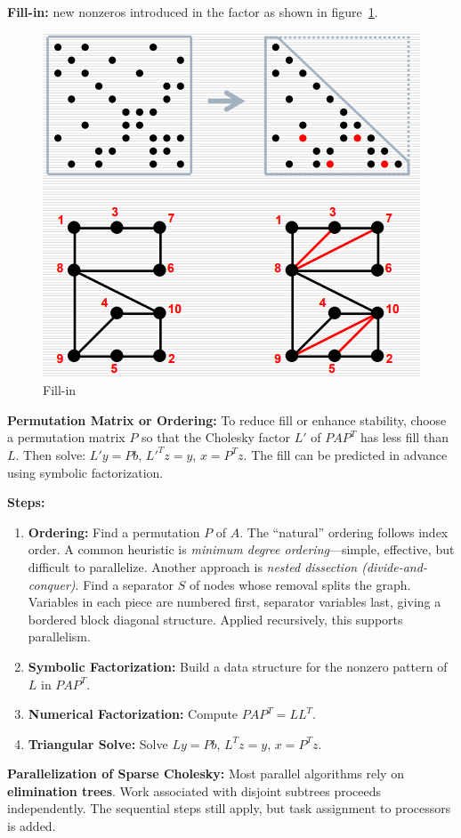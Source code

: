 \documentclass[12pt]{book}
\begin{document}
\textbf{Fill-in:} new nonzeros introduced in the factor as shown in figure~\ref{fig:fillins}.\\
\begin{figure}[ht]
    \centering
    \includegraphics[width=0.5\linewidth]{images/Fillin.png}
    \caption{Fill-in}
    \label{fig:fillins}
\end{figure}
\textbf{Permutation Matrix or Ordering:} To reduce fill or enhance stability, choose a permutation matrix $P$ so that the Cholesky factor $L'$ of $PAP^T$ has less fill than $L$.  
Then solve: $L'y = Pb$, $L'^T z = y$, $x = P^T z$.  
The fill can be predicted in advance using symbolic factorization.

\textbf{Steps:}
\begin{enumerate}
    \item \textbf{Ordering:} Find a permutation $P$ of $A$. The ``natural'' ordering follows index order.  
    A common heuristic is \emph{minimum degree ordering}—simple, effective, but difficult to parallelize.  
    Another approach is \emph{nested dissection (divide-and-conquer)}. Find a separator $S$ of nodes whose removal splits the graph. Variables in each piece are numbered first, separator variables last, giving a bordered block diagonal structure. Applied recursively, this supports parallelism.
    \item \textbf{Symbolic Factorization:} Build a data structure for the nonzero pattern of $L$ in $PAP^T$.
    \item \textbf{Numerical Factorization:} Compute $PAP^T = LL^T$.
    \item \textbf{Triangular Solve:} Solve $Ly = Pb$, $L^T z = y$, $x = P^T z$.
\end{enumerate}

\textbf{Parallelization of Sparse Cholesky:}  
Most parallel algorithms rely on \textbf{elimination trees}.  
Work associated with disjoint subtrees proceeds independently. The sequential steps still apply, but task assignment to processors is added.  
\end{document}
